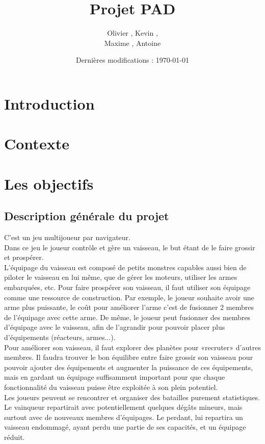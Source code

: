 \documentclass[a4paper,11pt]{report}
\title{Projet PAD}
\author{Olivier \bsc{Boissard}, Kevin \bsc{Boulala},\\
Maxime \bsc{Dubois}, Antoine \bsc{Lavier}}
\date{Dernières modifications : \today}
\begin{document}
\maketitle
\tableofcontents

\chapter{Introduction}


\chapter{Contexte}


\chapter{Les objectifs}
    \section{Description générale du projet}
    C'est un jeu multijoueur par navigateur.\\
    Dans ce jeu le joueur contrôle et gère un vaisseau, le but étant de le faire grossir et prospérer.\\
    L’équipage du vaisseau est composé de petits monstres capables aussi bien de piloter le vaisseau en lui même, que de gérer les moteurs, utiliser les armes embarquées, etc. Pour faire prospérer son vaisseau, il faut utiliser son équipage comme une ressource de construction. Par exemple, le joueur souhaite avoir une arme plus puissante, le coût pour améliorer l’arme c’est de fusionner 2 membres de l’équipage avec cette arme. De même, le joueur peut fusionner des membres d'équipage avec le vaisseau, afin de l'agrandir pour pouvoir placer plus d'équipements (réacteurs, armes...).\\
    Pour améliorer son vaisseau, il faut explorer des planètes pour «recruter» d’autres membres. Il faudra trouver le bon équilibre entre faire grossir son vaisseau pour pouvoir ajouter des équipements et augmenter la puissance de ces équipements, mais en gardant un équipage suffisamment important pour que chaque fonctionnalité du vaisseau puisse être exploitée à son plein potentiel.\\
    Les joueurs peuvent se rencontrer et organiser des batailles purement statistiques. Le vainqueur repartirait avec potentiellement quelques dégâts mineurs, mais surtout avec de nouveaux membres d’équipages. Le perdant, lui repartira un vaisseau endommagé, ayant perdu une partie de ses capacités, et un équipage réduit.\\
\end{document}
